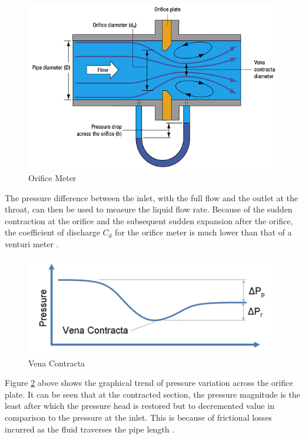 \begin{figure}[ht]
\includegraphics[width=0.9\linewidth]{Figures/orifice_with_flow.png}
\centering
\caption{Orifice Meter}
\label{fig:orifice_with_flow}
\end{figure}

The pressure difference between the inlet, with the full flow and the outlet at the throat, can then be used to measure the liquid flow rate. Because of the sudden contraction at the orifice and the subsequent sudden expansion after the orifice, the coefficient of discharge $C_{d}$ for the orifice meter is much lower than that of a venturi meter \cite{reader2015orifice}.

\begin{figure}[ht]
\includegraphics[width=0.9\linewidth]{Figures/venaContracta.png}
\centering
\caption{ Vena Contracta }
\label{fig:Vena_Contracta}
\end{figure}

Figure \ref{fig:Vena_Contracta} above shows the graphical trend of pressure variation across the orifice plate. It can be seen that at the contracted section, the pressure magnitude is the least after which the pressure head is restored but to decremented value in comparison to the pressure at the inlet. This is because of frictional losses incurred as the fluid traverses the pipe length \cite{shah2012analysis}.

